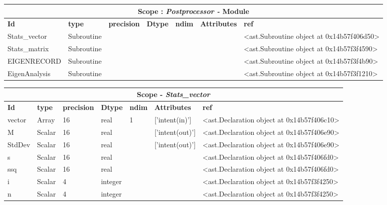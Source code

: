 \documentclass{report}
\begin{document}
\begin{center}
\begin{longtable}{|p{3.5cm}|p{1.5cm}|p{1.5cm}|p{1.5cm}|p{1cm}|p{2cm}|p{4cm}| }
\hline
\multicolumn{7}{|c|}{\textbf{Scope : \qquad}  \textbf{\textit{Postprocessor - }Module}}\\ 
\hline
\textbf{Id} & \textbf{type} & \textbf{precision} & \textbf{Dtype} & \textbf{ndim} & \textbf{Attributes} & \textbf{ref} \\\hline

Stats\_vector & Subroutine &  &  &  &  & <ast.Subroutine object at 0x14b57f406d50> \\\hline

Stats\_matrix & Subroutine &  &  &  &  & <ast.Subroutine object at 0x14b57f3f4590> \\\hline

EIGENRECORD & Subroutine &  &  &  &  & <ast.Subroutine object at 0x14b57f3f4b90> \\\hline

EigenAnalysis & Subroutine &  &  &  &  & <ast.Subroutine object at 0x14b57f3f1210> \\\hline

\end{longtable}
\end{center}

 \vspace{1cm}

\begin{center}
\begin{longtable}{|p{3.5cm}|p{1.5cm}|p{1.5cm}|p{1.5cm}|p{1cm}|p{2cm}|p{4cm}| }
\hline
\multicolumn{7}{|c|}{\textbf{Scope} -  \textbf{\textit{Stats\_vector}}} \\ 
\hline
\textbf{Id} & \textbf{type} & \textbf{precision} & \textbf{Dtype} & \textbf{ndim} & \textbf{Attributes} & \textbf{ref} \\\hline

vector & Array & 16 & real & 1 & ['intent(in)'] & <ast.Declaration object at 0x14b57f406c10> \\\hline

M & Scalar & 16 & real &  & ['intent(out)'] & <ast.Declaration object at 0x14b57f406e90> \\\hline

StdDev & Scalar & 16 & real &  & ['intent(out)'] & <ast.Declaration object at 0x14b57f406e90> \\\hline

s & Scalar & 16 & real &  &  & <ast.Declaration object at 0x14b57f406fd0> \\\hline

ssq & Scalar & 16 & real &  &  & <ast.Declaration object at 0x14b57f406fd0> \\\hline

i & Scalar & 4 & integer &  &  & <ast.Declaration object at 0x14b57f3f4250> \\\hline

n & Scalar & 4 & integer &  &  & <ast.Declaration object at 0x14b57f3f4250> \\\hline

\end{longtable}
\end{center}
\end{document}
